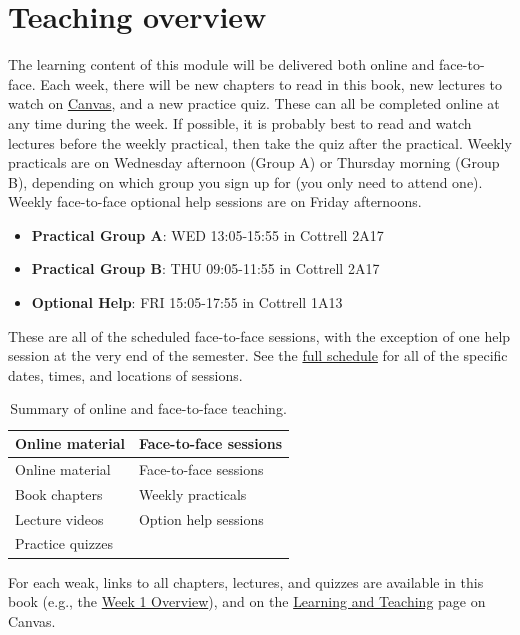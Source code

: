 \documentclass[
]{scrbook}
\providecommand{\tightlist}{%
  \setlength{\itemsep}{0pt}\setlength{\parskip}{0pt}}
\begin{document}
\hypertarget{teaching_overview}{%
\section*{Teaching overview}\label{teaching_overview}}

The learning content of this module will be delivered both online and face-to-face.
Each week, there will be new chapters to read in this book, new lectures to watch on \href{https://canvas.stir.ac.uk}{Canvas}, and a new practice quiz.
These can all be completed online at any time during the week.
If possible, it is probably best to read and watch lectures before the weekly practical, then take the quiz after the practical.
Weekly practicals are on Wednesday afternoon (Group A) or Thursday morning (Group B), depending on which group you sign up for (you only need to attend one).
Weekly face-to-face optional help sessions are on Friday afternoons.

\begin{itemize}
\tightlist
\item
  \textbf{Practical Group A}: WED 13:05-15:55 in Cottrell 2A17
\item
  \textbf{Practical Group B}: THU 09:05-11:55 in Cottrell 2A17
\item
  \textbf{Optional Help}: FRI 15:05-17:55 in Cottrell 1A13
\end{itemize}

These are all of the scheduled face-to-face sessions, with the exception of one help session at the very end of the semester.
See the \protect\hyperlink{schedule}{full schedule} for all of the specific dates, times, and locations of sessions.

\begin{longtable}[]{@{}ll@{}}
\caption{Summary of online and face-to-face teaching.}\tabularnewline
\toprule
Online material & Face-to-face sessions \\
\midrule
\endfirsthead
\toprule
Online material & Face-to-face sessions \\
\midrule
\endhead
Book chapters & Weekly practicals \\
Lecture videos & Option help sessions \\
Practice quizzes & \\
\bottomrule
\end{longtable}

For each weak, links to all chapters, lectures, and quizzes are available in this book (e.g., the \protect\hyperlink{Week1}{Week 1 Overview}), and on the \href{https://canvas.stir.ac.uk/courses/13075/pages/learning-and-teaching}{Learning and Teaching} page on Canvas.
\end{document}
